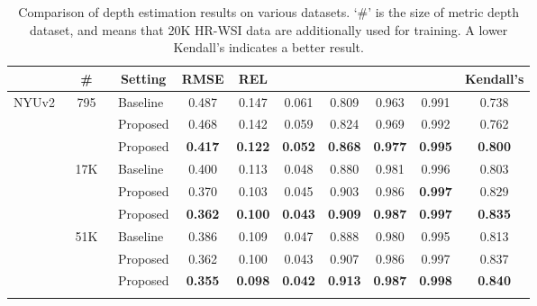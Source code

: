 \documentclass[runningheads]{llncs}
\begin{document}
\begin{table}[!t]
    \scriptsize
    \addtolength{\tabcolsep}{2.7pt}
    \renewcommand{\arraystretch}{1.1}
    \caption{Comparison of depth estimation results on various datasets. `\#' is the size of metric depth dataset, and  means that 20K HR-WSI data are additionally used for training. A lower Kendall's  indicates a better result.}
    \centering
    \begin{tabular}{c@{\hskip 0.9em}c@{\hskip 0.9em}c@{\hskip 0.9em}c@{\hskip 0.9em}c@{\hskip 0.9em}c@{\hskip 0.9em}c@{\hskip 0.9em}|ccccccc}
    \toprule
    \hspace{1.5cm} & \multicolumn{4}{c}{\#} & \multicolumn{2}{c}{Setting} & RMSE & REL &  &  &  &  & Kendall's \\
    \midrule
    \multicolumn{1}{c}{\multirow{10}{*}{NYUv2}}
    & \multicolumn{4}{c}{\multirow{3}{*}{795}} & \multicolumn{2}{|l|}{Baseline} & 0.487 & 0.147 & 0.061 & 0.809 & 0.963 & 0.991 & 0.738\\
    & \multicolumn{4}{c}{} & \multicolumn{2}{|l|}{Proposed} & 0.468 & 0.142 & 0.059 & 0.824 & 0.969 & 0.992 & 0.762\\
    & \multicolumn{4}{c}{} & \multicolumn{2}{|l|}{Proposed} & \textbf{0.417} & \textbf{0.122} & \textbf{0.052} & \textbf{0.868} & \textbf{0.977} & \textbf{0.995} & \textbf{0.800}\\ \cmidrule(lr){2-14}
    & \multicolumn{4}{c}{\multirow{3}{*}{17K}} & \multicolumn{2}{|l|}{Baseline} & 0.400 & 0.113 & 0.048 & 0.880 & 0.981 & 0.996 & 0.803\\
    & \multicolumn{4}{c}{} & \multicolumn{2}{|l|}{Proposed} & 0.370 & 0.103 & 0.045  & 0.903 & 0.986 & \textbf{0.997}& 0.829\\
    & \multicolumn{4}{c}{} & \multicolumn{2}{|l|}{Proposed} & \textbf{0.362} & \textbf{0.100} & \textbf{0.043} & \textbf{0.909} & \textbf{0.987} & \textbf{0.997} & \textbf{0.835}\\ \cmidrule(lr){2-14}
    & \multicolumn{4}{c}{\multirow{3}{*}{51K}} & \multicolumn{2}{|l|}{Baseline} & 0.386 & 0.109 & 0.047 & 0.888 & 0.980 & 0.995 & 0.813\\
    & \multicolumn{4}{c}{} & \multicolumn{2}{|l|}{Proposed} & 0.362 & 0.100 & 0.043 & 0.907 & 0.986 & 0.997 & 0.837\\
    & \multicolumn{4}{c}{} & \multicolumn{2}{|l|}{Proposed} & \textbf{0.355} & \textbf{0.098} & \textbf{0.042} & \textbf{0.913} & \textbf{0.987} & \textbf{0.998} & \textbf{0.840}\\
    \midrule
    \multicolumn{1}{c}{\multirow{3}{*}{DIML-Indoor}}

\end{tabular}
\end{table}
\end{document}
